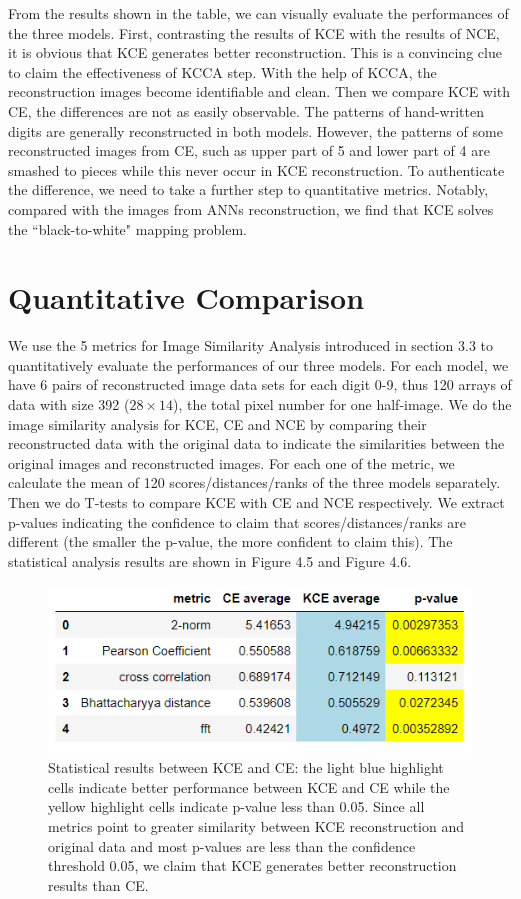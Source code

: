 \documentclass[12pt]{report} %
\begin{document}
From the results shown in the table, we can visually evaluate the performances of the three models. First, contrasting the results of KCE with the results of NCE, it is obvious that KCE generates better reconstruction. This is a convincing clue to claim the effectiveness of KCCA step. With the help of KCCA, the reconstruction images become identifiable and clean. Then we compare KCE with CE, the differences are not as easily observable. The patterns of hand-written digits are generally reconstructed in both models. However, the patterns of some reconstructed images from CE, such as upper part of 5 and lower part of 4 are smashed to pieces while this never occur in KCE reconstruction. To authenticate the difference, we need to take a further step to quantitative metrics. Notably, compared with the images from ANNs reconstruction, we find that KCE solves the ``black-to-white" mapping problem.

\section{Quantitative Comparison}
We use the 5 metrics for Image Similarity Analysis introduced in section 3.3 to quantitatively evaluate the performances of our three models. For each model, we have 6 pairs of reconstructed image data sets for each digit 0-9, thus 120 arrays of data with size 392 ($28 \times 14$), the total pixel number for one half-image. We do the image similarity analysis for KCE, CE and NCE by comparing their reconstructed data with the original data to indicate the similarities between the original images and reconstructed images. For each one of the metric, we calculate the mean of 120 scores/distances/ranks of the three models separately. Then we do T-tests\cite{TTEST} to compare KCE with CE and NCE respectively. We extract p-values indicating the confidence to claim that scores/distances/ranks are different (the smaller the p-value, the more confident to claim this). The statistical analysis results are shown in Figure 4.5 and Figure 4.6.

\begin{figure}[H]
	\centering
	\includegraphics[scale=1.2]{pictures/KE-M1.png}
	\caption{Statistical results between KCE and CE: the light blue highlight cells indicate better performance between KCE and CE while the yellow highlight cells indicate p-value less than 0.05. Since all metrics point to greater similarity between KCE reconstruction and original data and most p-values are less than the confidence threshold 0.05, we claim that KCE generates better reconstruction results than CE.}
	\label{fig:6}
\end{figure}
\end{document}
